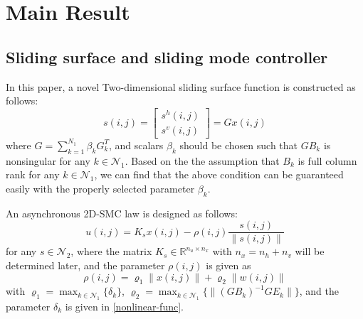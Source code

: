 \documentclass[conference]{IEEEtran}
\begin{document}
\section{Main Result}

\subsection{ Sliding surface and sliding mode controller} \label{sliding-surface}
	In this paper, a novel Two-dimensional sliding surface function is constructed as follows: 
	\begin{equation}\label{siding-surface-equation}	
		s(i,j) = \begin{bmatrix}
					s^{h}(i,j)\\
					s^{v}(i,j)
					\end{bmatrix}
			   = Gx(i,j)
	\end{equation}
	where $G=\sum_{k=1}^{N_{1}}\beta_{k}G^{T}_{k}$, and scalars $\beta_{k}$ should be chosen such that $GB_{k}$ is nonsingular for any $k\in\mathcal{N}_{1}$. Based on the the assumption that $B_{k}$ is full column rank for any $k\in\mathcal{N}_{1}$, we can find that the above condition can be guaranteed easily with the properly selected parameter $\beta_{k}$. 
 	
 	An asynchronous 2D-SMC law is designed as follows:
	\begin{equation}\label{smc-law}
		u(i,j) = K_{s}x(i,j)-\rho(i,j)\frac{s(i,j)}{\|s(i,j)\|}
	\end{equation}
	for any $s\in\mathcal{N}_{2}$, where the matrix $K_{s}\in\mathbb{R}^{n_u\times n_x}$ with $n_x=n_h+n_v$ will be determined later, and the parameter $\rho(i,j)$ is given as
	\begin{equation}
	\rho(i,j) = \varrho_{1}\|x(i,j)\| + \varrho_{2}\|w(i,j)\|
	\end{equation}
	with $\varrho_{1}=\max_{k\in\mathcal{N}_{1}} \{\delta_{k} \}$, $\varrho_{2} = \max_{k\in\mathcal{N}_{1}}\{\|(GB_{k})^{-1}GE_{k}\| \} $, and the parameter $\delta_{k}$ is given in \eqref{nonlinear-func}. 
	
\end{document}
